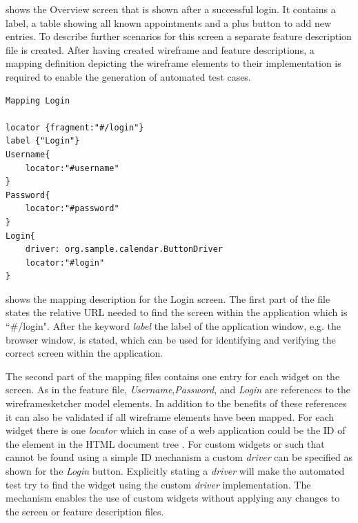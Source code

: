 \documentclass{sig-alternate-05-2015}
\begin{document}
 shows the Overview screen that is shown after a successful login.
It contains a label, a table showing all known appointments and a plus button to add new entries.
To describe further scenarios for this screen a separate feature description file is created.
After having created wireframe and feature descriptions, a mapping definition depicting the wireframe elements to their implementation is required to enable the generation of automated test cases.

\begin{lstlisting}[captionpos=b, caption=Mapping Description: Login Screen., label={lst:mappinglogin}, language=dsl]
Mapping Login

locator {fragment:"#/login"}
label {"Login"}
Username{
	locator:"#username"
}
Password{
	locator:"#password"
}
Login{ 
    driver: org.sample.calendar.ButtonDriver
    locator:"#login"
}
\end{lstlisting}

 shows the mapping description for the Login screen.
The first part of the file states the relative URL needed to find the screen within the application which is ``\#/login". 
After the keyword \textit{label} the label of the application window, e.g. the browser window, is stated, which can be used for identifying and verifying the correct screen within the application.

The second part of the mapping files contains one entry for each widget on the screen.
As in the feature file, \textit{Username},\textit{Password}, and \textit{Login} are references to the wireframesketcher model elements.
In addition to the benefits of these references it can also be validated if all wireframe elements have been mapped.
For each widget there is one \textit{locator} which in case of a web application could be the ID of the element in the HTML document tree \cite{w3c.dom}.
For custom widgets or such that cannot be found using a simple ID mechanism a custom \textit{driver} can be specified as shown for the \textit{Login} button.
Explicitly stating a \textit{driver} will make the automated test try to find the widget using the custom \textit{driver} implementation. 
The mechanism enables the use of custom widgets without applying any changes to the screen or feature description files.
\end{document}
